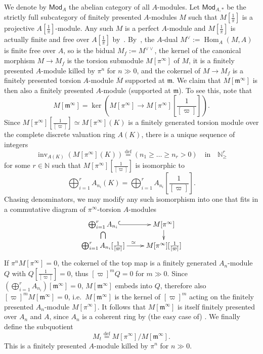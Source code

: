 \documentclass[11pt]{article}
\theoremstyle{definition}
\numberwithin{equation}{section}
\numberwithin{figure}{section}
\numberwithin{table}{section}
\newcommand{\Mod}{\mathsf{Mod}}
\DeclareMathOperator{\inv}{inv}
\DeclareMathOperator{\Hom}{Hom}
\newcommand{\eqd}{\stackrel{\mathrm{def}}{=}}
\begin{document}
We denote by $\Mod_{A}$ the abelian category of all $A$-modules. Let $\Mod_{A,\ast}$ be the strictly full subcategory of finitely presented $A$-modules $M$ such that $M[\frac{1}{\pi}]$ is a projective $A[\frac{1}{\pi}]$-module. Any such $M$ is a perfect $A$-module and $M[\frac{1}{\pi}]$ is actually finite and free over $A[\frac{1}{\pi}]$ by~\cite[4.9 \& 4.12]{BaMoSc16}. By~\cite[4.13]{BaMoSc16}, the $A$-dual $M^{\vee}:=\Hom_{A}(M,A)$ is finite free over $A$, so is the bidual $M_{f}:=M^{\vee\vee}$, the kernel of the canonical morphism $M\rightarrow M_{f}$ is the torsion submodule $M[\pi^{\infty}]$ of $M$, it is a finitely presented $A$-module killed by $\pi^{n}$ for $n\gg0$, and the cokernel of $M\rightarrow M_{f}$ is a finitely presented torsion $A$-module $\overline{M}$ supported at $\mathfrak{m}$. We claim that $M[\mathfrak{m}^{\infty}]$ is then also a finitely presented $A$-module (supported at $\mathfrak{m}$). To see this, note that
\[
M[\mathfrak{m}^{\infty}]=\ker\left(M[\pi^{\infty}]\rightarrow M[\pi^{\infty}]\!\left[{\frac{1}{[\varpi]}}\right]\right).
\]
Since $M[\pi^{\infty}][{\frac{1}{[\varpi]}}]\simeq M[\pi^{\infty}](K)$ is a finitely generated torsion module over the complete discrete valuation ring $A(K)$, there is a unique sequence of integers
\[
\inv_{A(K)}\left(M[\pi^{\infty}](K)\right)\eqd(n_{1}\geq\dots\geq n_{r}>0)\quad\text{in}\quad\mathbb{N}_{\geq}^{r}
\]
for some $r\in\mathbb{N}$ such that $M[\pi^{\infty}][{
\frac{1}{[\varpi]}}]$ is isomorphic to
\[
\bigoplus_{i=1}^{r}A_{n_{i}}(K)=\bigoplus_{i=1}^{r}A_{n_{i}}\!\left[{\frac{1}{[\varpi]}}\right]\!.
\]
Chasing denominators, we may modify any such isomorphism into one that fits in a commutative diagram of $\pi^{\infty}$-torsion $A$-modules
\[
\xymatrix@C=2pc@R=1pc{
\bigoplus_{i=1}^{r}A_{n_{i}} \ar@{^{(}->}[r] \ar@{}[d]|{\bigcap}& M[\pi^{\infty}]\ar[d]\\
\bigoplus_{i=1}^{r}A_{n_{i}}[{\frac{1}{[\varpi]}]} \ar[r]^{\simeq} & M[\pi^{\infty}][{\frac{1}{[\varpi]}]}
}
\]
If $\pi^{n}M[\pi^{\infty}]=0$, the cokernel of the top map is a finitely generated $A_{n}$-module $Q$ with $Q[\frac{1}{[\varpi]}]=0$, thus $[\varpi]^{m}Q=0$ for $m\gg0$. Since $(\bigoplus_{i=1}^{r}A_{n_{i}})[\mathfrak{m}^{\infty}]=0$, $M[\mathfrak{m}^{\infty}]$ embeds into $Q$, therefore also $[\varpi]^{m}M[\mathfrak{m}^{\infty}]=0$, i.e.~$M[\mathfrak{m}^{\infty}]$ is the kernel of $[\varpi]^{m}$ acting on the finitely presented $A_{n}$-module $M[\pi^{\infty}]$. It follows that $M[\mathfrak{m}^{\infty}]$ is itself finitely presented over $A_{n}$ and $A$, since $A_{n}$ is a coherent ring by (the easy case of) \cite[Proposition~3.24]{BaMoSc16}. We finally define the subquotient
\[
M_{t}\eqd M[\pi^{\infty}]/M[\mathfrak{m}^{\infty}].
\]
This is a finitely presented $A$-module killed by $\pi^{n}$ for $n\gg0$.
\end{document}
